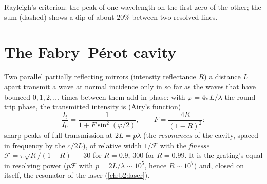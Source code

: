 \begin{omfigure}

{\small Rayleigh's criterion: the peak of one wavelength on the first
zero of the other; the sum (dashed) shows a dip of about $20\%$ between
two resolved lines.}
\end{omfigure}

\section{The Fabry--Pérot cavity}

\begin{proposition}\label{prop:b2:gratings:fabryperot}
Two parallel partially reflecting mirrors (intensity reflectance $R$)
a distance $L$ apart transmit a wave at normal incidence only in so far
as the waves that have bounced $0, 1, 2, \dots$ times between them add
in phase: with $\varphi = 4\pi L/\lambda$ the round-trip phase, the transmitted
intensity is (Airy's function)
\[
\frac{I_t}{I_0} = \frac1{1 + F\sin^2(\varphi/2)} , \qquad F = \frac{4R}{(1 - R)^2} :
\]
sharp peaks of full transmission at $2L = p\lambda$ (the \emph{resonances}
of the cavity, spaced in frequency by the \emph{}
$c/2L$), of relative width $1/\mathcal F$ with the \emph{finesse} $\mathcal F = \pi
\sqrt R/(1 - R)$ --- $30$ for $R = 0.9$, $300$ for $R = 0.99$. It is the grating's
equal in resolving power ($p\mathcal F$ with $p = 2L/\lambda \sim 10^5$, hence $R \sim
10^7$) and, closed on itself, the resonator of the laser
(\cref{ch:b2:laser}).
\end{proposition}

